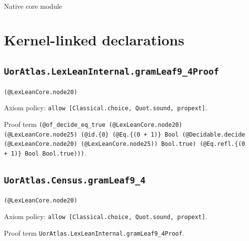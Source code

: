 \documentclass[11pt]{article}
\begin{document}
\begin{center}{\LARGE Native core module}\end{center}
\section*{Kernel-linked declarations}
\subsection*{\texttt{UorAtlas.LexLeanInternal.gramLeaf9\_4Proof}}
\noindent\texttt{(@LexLeanCore.node20)}\par
\noindent Axiom policy: \texttt{allow [Classical.choice, Quot.sound, propext]}.\par
\noindent Proof term \texttt{(@of\_decide\_eq\_true (@LexLeanCore.node20) (@LexLeanCore.node25) (@id.\{0\} (@Eq.\{(0 + 1)\} Bool (@Decidable.decide (@LexLeanCore.node20) (@LexLeanCore.node25)) Bool.true) (@Eq.refl.\{(0 + 1)\} Bool Bool.true)))}.\par
\subsection*{\texttt{UorAtlas.Census.gramLeaf9\_4}}
\noindent\texttt{(@LexLeanCore.node20)}\par
\noindent Axiom policy: \texttt{allow [Classical.choice, Quot.sound, propext]}.\par
\noindent Proof term \texttt{UorAtlas.LexLeanInternal.gramLeaf9\_4Proof}.\par
\end{document}
